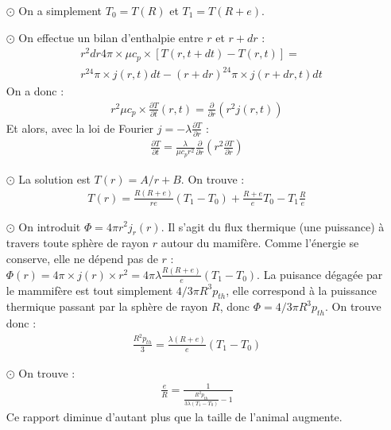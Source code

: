 \documentclass{report}
\begin{document}
\begin{itemize}

	\item[$\odot$] On a simplement $T_{0}=T(R)$ et $T_1=T(R+e)$.
	
	\item[$\odot$] On effectue un bilan d'enthalpie entre $r$ et $r+dr$ :
	\begin{align*}
		& r^2dr4\pi\times \mu c_p\times[T(r,t+dt)-T(r,t)]= \\
		& r^24\pi\times j(r,t)dt-(r+dr)^24\pi\times j(r+dr,t)dt
	\end{align*}
	On a donc :
	\begin{align*}
		 r^2 \mu c_p\times\frac{\partial T}{\partial t}(r,t)= \frac{\partial}{\partial r} \left( r^2j(r,t)\right)
	\end{align*}	
	Et alors, avec la loi de Fourier $j=-\lambda\frac{\partial T}{\partial r}$ :
	\begin{align*}
		\frac{\partial T}{\partial t}=\frac{\lambda}{\mu c_pr^2}\frac{\partial }{\partial r}\left( r^2\frac{\partial T}{\partial r}\right)
	\end{align*}

	\item[$\odot$] La solution est $T(r)=A/r+B$. On trouve :
	\begin{align*}
		T(r) = \frac{R(R+e)}{re}(T_1-T_0)+\frac{R+e}{e}T_0-T_1\frac{R}{e}
	\end{align*}
	
	\item[$\odot$] On introduit $\Phi=4\pi r^2j_r(r)$. Il s'agit du flux thermique (une puissance) à travers toute sphère de rayon $r$ autour du mamifère. Comme l'énergie se conserve, elle ne dépend pas de $r$ : $\Phi(r) =4\pi\times j(r)\times r^2=4\pi \lambda\frac{R(R+e)}{e}(T_1-T_0)$. La puisance dégagée par le mammifère est tout simplement $4/3\pi R^3p_{th}$, elle correspond à la puissance thermique passant par la sphère de rayon $R$, donc $\Phi =4/3\pi R^3p_{th}$. On trouve donc :
	\begin{align*}
		\frac{R^2p_{th}}{3}=\frac{\lambda (R+e)}{e}(T_1-T_0)
	\end{align*}
	
	\item[$\odot$] On trouve :
	\begin{align*}
		\frac{e}{R}=\frac{1}{\frac{R^2p_{th}}{3\lambda(T_1-T_0)}-1}
	\end{align*}
	Ce rapport diminue d'autant plus que la taille de l'animal augmente.

\end{itemize}
\end{document}
